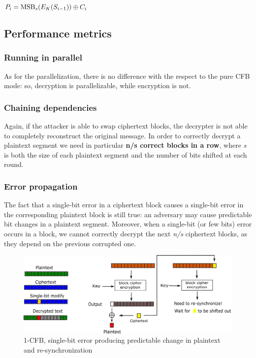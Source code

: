 \documentclass[11 pt]{article}
\begin{document}
$ \newline P_{i}={\mbox{MSB}}_s(E_{K}(S_{i-1}))\oplus C_{i} \newline $

\subsection{Performance metrics}
\subsubsection{Running in parallel}
As for the parallelization, there is no difference with the respect to the pure CFB mode: so, decryption is parallelizable, while encryption is not.
\subsubsection{Chaining dependencies}
Again, if the attacker is able to swap ciphertext blocks, the decrypter is not able to completely reconstruct the original message. In order to correctly decrypt a plaintext segment we need in particular \textbf{n/s correct blocks in a row}, where \textit{s} is both the size of each plaintext segment and the number of bits shifted at each round.
\subsubsection{Error propagation}
The fact that a single-bit error in a ciphertext block causes a single-bit error in the corresponding plaintext block is still true: an adversary may cause predictable bit changes in a plaintext segment. Moreover, when a single-bit (or few bits) error occurs in a block, we cannot correctly decrypt the next \textit{n/s} ciphertext blocks, as they depend on the previous corrupted one.
\begin{figure}[!ht]
	\centering %
	\includegraphics[width=1\textwidth]{1_CFB_single_bit_error-hw1-1699981.png} %
	\caption{1-CFB, single-bit error producing predictable change in plaintext and re-synchronization} %
	\label{fig:1_CFB_single_bit_error}
\end{figure}
\end{document}
